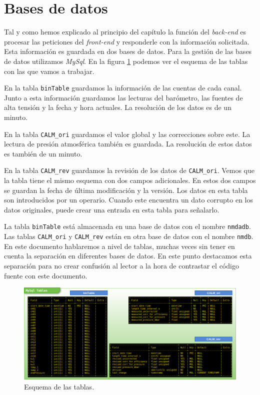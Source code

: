 \section{Bases de datos}
	Tal y como hemos explicado al principio del capítulo la función del \emph{back-end} es  procesar las peticiones del \emph{front-end} y
	responderle con la información solicitada. Esta información es guardada en dos bases de datos. Para la gestión de las bases de datos
	utilizamos \emph{MySql}\cite{MySql}. En la figura \ref{fig:tablas} podemos ver el esquema de las tablas con las que vamos a trabajar.
	\par
	En la tabla \texttt{binTable} guardamos la información de las cuentas de cada canal. Junto a esta información guardamos las lecturas del
	barómetro, las fuentes de alta tensión y la fecha y hora actuales. La resolución de los datos es de un minuto.
	\par
	En la tabla \texttt{CALM\_ori} guardamos el valor global y las correcciones sobre este. La lectura de presión atmosférica también es guardada.
	La resolución de estos datos es también de un minuto.
	\par
	En la tabla \texttt{CALM\_rev} guardamos la revisión de los datos de \texttt{CALM\_ori}. Vemos que la tabla tiene el mismo esquema con dos
	campos adicionales. En estos dos campos se guardan la fecha de última modificación y la versión. Los datos en esta tabla son introducidos por
	un operario. Cuando este encuentra un dato corrupto en los datos originales, puede crear una entrada en esta tabla para señalarlo.
	\par
	La tabla \texttt{binTable} está almacenada en una base de datos con el nombre \texttt{nmdadb}. Las tablas \texttt{CALM\_ori} y
	\texttt{CALM\_rev} están en otra base de datos con el nombre \texttt{nmdb}. En este documento hablaremos a nivel de tablas, muchas veces sin
	tener en cuenta la separación en diferentes bases de datos. En este punto destacamos esta separación para no crear confusión al lector a la
	hora de contrastar el código fuente con este documento. 
	\begin{figure}[h]
		\centering
		\includegraphics[keepaspectratio, width=1\textwidth]{./img/tablas.png}
		\caption{Esquema de las tablas.}
		\label{fig:tablas}
	\end{figure}
